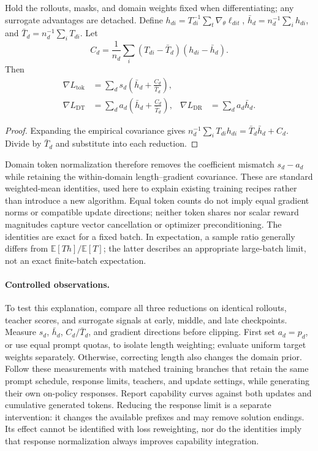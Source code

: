 \begin{proposition}
\label{prop:norm_covariance}
Hold the rollouts, masks, and domain weights fixed when differentiating;
any surrogate advantages are detached. Define
$h_{di}=T_{di}^{-1}\sum_t\nabla_\theta\ell_{dit}$,
$\bar h_d=n_d^{-1}\sum_ih_{di}$, and
$\bar T_d=n_d^{-1}\sum_iT_{di}$. Let
\begin{equation}
 C_d=\frac1{n_d}\sum_i(T_{di}-\bar T_d)(h_{di}-\bar h_d).
 \label{eq:norm_covariance}
\end{equation}
Then
\begin{align}
 \nabla L_{\mathrm{tok}}
   &=\sum_ds_d\left(\bar h_d+\frac{C_d}{\bar T_d}\right),
     \label{eq:norm_global_gradient}\\
 \nabla L_{\mathrm{DT}}
   &=\sum_da_d\left(\bar h_d+\frac{C_d}{\bar T_d}\right),
 &\nabla L_{\mathrm{DR}}&=\sum_da_d\bar h_d.
     \label{eq:norm_domain_gradients}
\end{align}
\end{proposition}
\begin{proof}
Expanding the empirical covariance gives
$n_d^{-1}\sum_iT_{di}h_{di}=\bar T_d\bar h_d+C_d$.
Divide by $\bar T_d$ and substitute into each reduction.
\end{proof}

Domain token normalization therefore removes the coefficient mismatch
$s_d-a_d$ while retaining the within-domain length--gradient covariance.
These are standard weighted-mean identities, used here to explain existing
training recipes rather than introduce a new algorithm. Equal token
counts do not imply equal gradient norms or compatible update directions;
neither token shares nor scalar reward magnitudes capture vector
cancellation or optimizer preconditioning. The identities are exact for
a fixed batch. In expectation, a sample ratio generally differs from
$\mathbb E[Th]/\mathbb E[T]$; the latter describes an appropriate
large-batch limit, not an exact finite-batch expectation.

\paragraph{Controlled observations.}
To test this explanation, compare all three reductions on identical
rollouts, teacher scores, and surrogate signals at early, middle, and late
checkpoints. Measure $s_d$, $\bar h_d$, $C_d/\bar T_d$, and gradient
directions before clipping. First set $a_d=p_d$, or use equal prompt
quotas, to isolate length weighting; evaluate uniform target weights
separately. Otherwise, correcting length also changes the domain prior.
Follow these measurements with matched training branches that retain the
same prompt schedule, response limits, teachers, and update settings,
while generating their own on-policy responses. Report capability curves
against both updates and cumulative generated tokens.
Reducing the response limit is a separate intervention: it changes the
available prefixes and may remove solution endings. Its effect cannot be
identified with loss reweighting, nor do the identities imply that
response normalization always improves capability integration.
